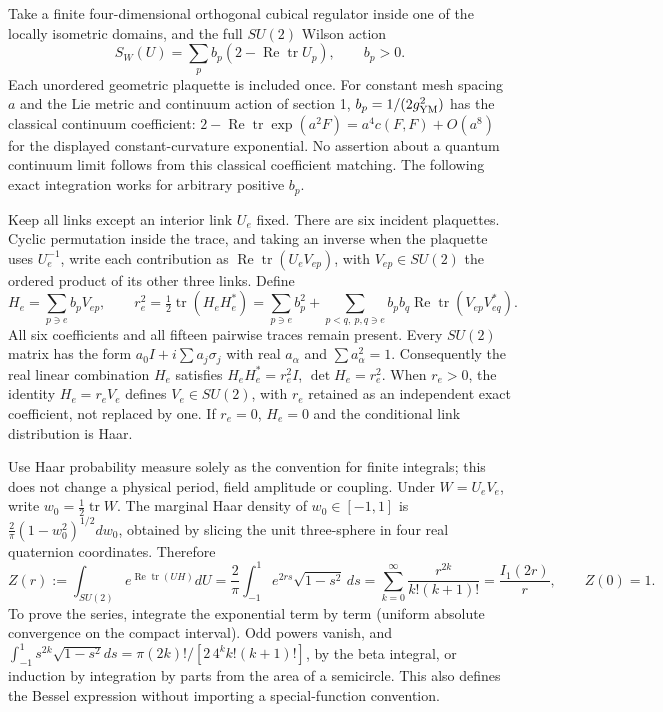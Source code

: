 \documentclass[
  11pt,
]{article}
\begin{document}
Take a finite four-dimensional orthogonal cubical regulator inside one
of the locally isometric domains, and the full \(SU(2)\) Wilson action
\[
 S_W(U)=\sum_p b_p(2-\operatorname{Re}\operatorname{tr}U_p),\qquad b_p>0.
\] Each unordered geometric plaquette is included once. For constant
mesh spacing \(a\) and the Lie metric and continuum action of section 1,
\(b_p=1/(2g_{\rm YM}^2)\) has the classical continuum coefficient:
\(2-\operatorname{Re}\operatorname{tr}\exp(a^2F)=a^4c(F,F)+O(a^8)\) for
the displayed constant-curvature exponential. No assertion about a
quantum continuum limit follows from this classical coefficient
matching. The following exact integration works for arbitrary positive
\(b_p\).

Keep all links except an interior link \(U_e\) fixed. There are six
incident plaquettes. Cyclic permutation inside the trace, and taking an
inverse when the plaquette uses \(U_e^{-1}\), write each contribution as
\(\operatorname{Re}\operatorname{tr}(U_e V_{ep})\), with
\(V_{ep}\in SU(2)\) the ordered product of its other three links. Define
\[
 H_e=\sum_{p\ni e}b_pV_{ep},\qquad
 r_e^2=\tfrac12\operatorname{tr}(H_eH_e^*)
 =\sum_{p\ni e}b_p^2+
   \sum_{p<q,\ p,q\ni e}b_pb_q\operatorname{Re}\operatorname{tr}(V_{ep}V_{eq}^*).
\] All six coefficients and all fifteen pairwise traces remain present.
Every \(SU(2)\) matrix has the form \(a_0I+i\sum a_j\sigma_j\) with real
\(a_\alpha\) and \(\sum a_\alpha^2=1\). Consequently the real linear
combination \(H_e\) satisfies \(H_eH_e^*=r_e^2I\), \(\det H_e=r_e^2\).
When \(r_e>0\), the identity \(H_e=r_eV_e\) defines \(V_e\in SU(2)\),
with \(r_e\) retained as an independent exact coefficient, not replaced
by one. If \(r_e=0\), \(H_e=0\) and the conditional link distribution is
Haar.

Use Haar probability measure solely as the convention for finite
integrals; this does not change a physical period, field amplitude or
coupling. Under \(W=U_eV_e\), write \(w_0=\tfrac12\operatorname{tr}W\).
The marginal Haar density of \(w_0\in[-1,1]\) is
\(\tfrac2\pi(1-w_0^2)^{1/2}dw_0\), obtained by slicing the unit
three-sphere in four real quaternion coordinates. Therefore \[
 Z(r):=\int_{SU(2)}e^{\operatorname{Re}\operatorname{tr}(UH)}dU
 =\frac2\pi\int_{-1}^1e^{2rs}\sqrt{1-s^2}\,ds
 =\sum_{k=0}^\infty\frac{r^{2k}}{k!(k+1)!}
 =\frac{I_1(2r)}r,\qquad Z(0)=1.
\] To prove the series, integrate the exponential term by term (uniform
absolute convergence on the compact interval). Odd powers vanish, and
\(\int_{-1}^1s^{2k}\sqrt{1-s^2}ds
=\pi(2k)!/[2\,4^k k!(k+1)!]\), by the beta integral, or induction by
integration by parts from the area of a semicircle. This also defines
the Bessel expression without importing a special-function convention.
\end{document}
